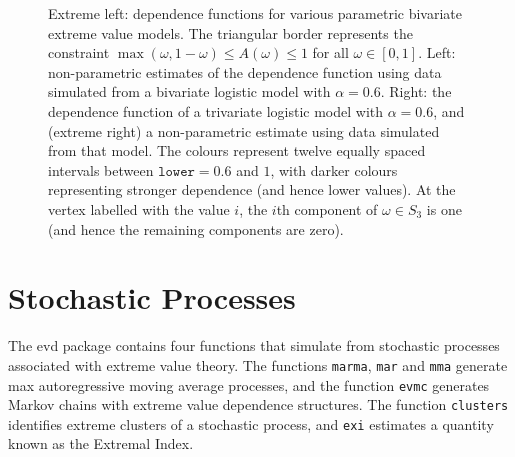 \documentclass[11pt,a4paper]{article}
\begin{document}
\begin{figure}
\begin{center}
\vspace{-1.5cm}
\hspace{0cm}
\hspace{0cm} 
\hspace{0cm}
\end{center} 
\caption{Extreme left: dependence functions for various parametric bivariate extreme value models. The triangular border represents the constraint $\max(\omega,1-\omega) \leq A(\omega) \leq 1$ for all $\omega \in [0,1]$. Left: non-parametric estimates of the dependence function using data simulated from a bivariate logistic model with $\alpha = 0.6$. Right: the dependence function of a trivariate logistic model with $\alpha = 0.6$, and (extreme right) a non-parametric estimate using data simulated from that model. The colours represent twelve equally spaced intervals between $\texttt{lower} = 0.6$ and $1$, with darker colours representing stronger dependence (and hence lower values). At the vertex labelled with the value $i$, the $i$th component of $\omega \in S_3$ is one (and hence the remaining components are zero).}
\label{depfns}
\end{figure}


\section{Stochastic Processes}
\setcounter{footnote}{0}
\label{stochproc}

The evd package contains four functions that simulate from stochastic processes associated with extreme value theory.
The functions \verb+marma+, \verb+mar+ and \verb+mma+ generate max autoregressive moving average processes, and the function \verb+evmc+ generates Markov chains with extreme value dependence structures.
The function \verb+clusters+ identifies extreme clusters of a stochastic process, and \verb+exi+ estimates a quantity known as the Extremal Index.
\end{document}
